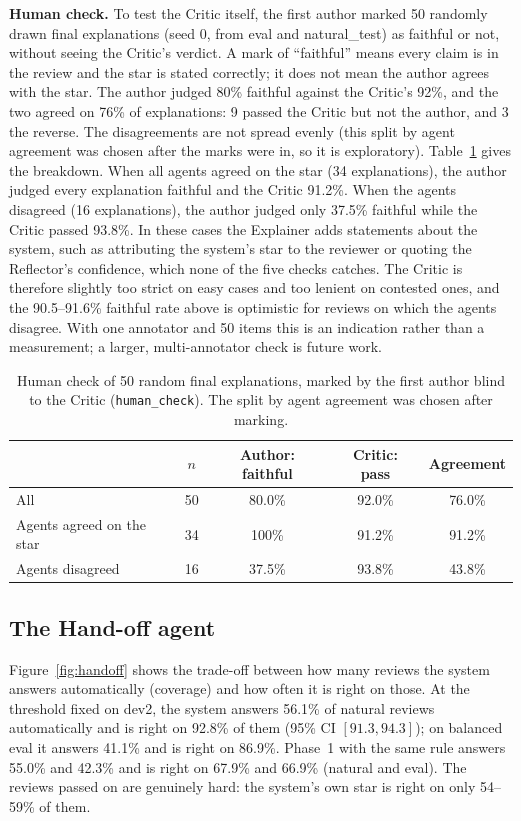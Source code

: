 \documentclass[runningheads]{llncs}
\begin{document}
\textbf{Human check.} To test the Critic itself, the first author marked 50 randomly drawn final explanations (seed 0, from eval and natural\_test) as faithful or not, without seeing the Critic's verdict. A mark of ``faithful'' means every claim is in the review and the star is stated correctly; it does not mean the author agrees with the star. The author judged 80\% faithful against the Critic's 92\%, and the two agreed on 76\% of explanations: 9 passed the Critic but not the author, and 3 the reverse. The disagreements are not spread evenly (this split by agent agreement was chosen after the marks were in, so it is exploratory). Table~\ref{tbl:human} gives the breakdown. When all agents agreed on the star (34 explanations), the author judged every explanation faithful and the Critic 91.2\%. When the agents disagreed (16 explanations), the author judged only 37.5\% faithful while the Critic passed 93.8\%. In these cases the Explainer adds statements about the system, such as attributing the system's star to the reviewer or quoting the Reflector's confidence, which none of the five checks catches. The Critic is therefore slightly too strict on easy cases and too lenient on contested ones, and the 90.5--91.6\% faithful rate above is optimistic for reviews on which the agents disagree. With one annotator and 50 items this is an indication rather than a measurement; a larger, multi-annotator check is future work.

\begin{table}[t]
\centering
\caption{Human check of 50 random final explanations, marked by the first author blind to the Critic (\texttt{human\_check}). The split by agent agreement was chosen after marking.}
\label{tbl:human}
\small
\begin{tabular}{lcccc}
\toprule
 & $n$ & Author: faithful & Critic: pass & Agreement \\
\midrule
All & 50 & 80.0\% & 92.0\% & 76.0\% \\
Agents agreed on the star & 34 & 100\% & 91.2\% & 91.2\% \\
Agents disagreed & 16 & 37.5\% & 93.8\% & 43.8\% \\
\bottomrule
\end{tabular}
\end{table}

\subsection{The Hand-off agent}

Figure~\ref{fig:handoff} shows the trade-off between how many reviews the system answers automatically (coverage) and how often it is right on those. At the threshold fixed on dev2, the system answers 56.1\% of natural reviews automatically and is right on 92.8\% of them (95\% CI $[91.3, 94.3]$); on balanced eval it answers 41.1\% and is right on 86.9\%. Phase~1 with the same rule answers 55.0\% and 42.3\% and is right on 67.9\% and 66.9\% (natural and eval). The reviews passed on are genuinely hard: the system's own star is right on only 54--59\% of them.
\end{document}
